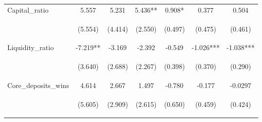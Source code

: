 \documentclass[]{article}
\begin{document}
\begin{center}
\begin{tabular}{lcccccc}
Capital\_ratio & 5.557 & 5.231 & 5.436** & 0.908* & 0.377 & 0.504 \\
\vspace{4pt} & \begin{footnotesize}(5.554)\end{footnotesize} & \begin{footnotesize}(4.414)\end{footnotesize} & \begin{footnotesize}(2.550)\end{footnotesize} & \begin{footnotesize}(0.497)\end{footnotesize} & \begin{footnotesize}(0.475)\end{footnotesize} & \begin{footnotesize}(0.461)\end{footnotesize} \\
Liquidity\_ratio & -7.219** & -3.169 & -2.392 & -0.549 & -1.026*** & -1.038*** \\
\vspace{4pt} & \begin{footnotesize}(3.640)\end{footnotesize} & \begin{footnotesize}(2.688)\end{footnotesize} & \begin{footnotesize}(2.267)\end{footnotesize} & \begin{footnotesize}(0.398)\end{footnotesize} & \begin{footnotesize}(0.370)\end{footnotesize} & \begin{footnotesize}(0.290)\end{footnotesize} \\
Core\_deposits\_wins & 4.614 & 2.667 & 1.497 & -0.780 & -0.177 & -0.0297 \\
\vspace{4pt} & \begin{footnotesize}(5.605)\end{footnotesize} & \begin{footnotesize}(2.909)\end{footnotesize} & \begin{footnotesize}(2.615)\end{footnotesize} & \begin{footnotesize}(0.650)\end{footnotesize} & \begin{footnotesize}(0.459)\end{footnotesize} & \begin{footnotesize}(0.424)\end{footnotesize} \\

\end{tabular}
\end{center}
\end{document}
